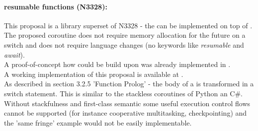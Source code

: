 \paragraph*{resumable functions (N3328\cite{n3328}):}
This proposal is a library superset of N3328 - the \resumfn can be implemented
on top of \coro. The proposed coroutine does not require memory allocation for
the future on a switch and does not require language changes (no keywords like
\textit{resumable} and \textit{await}).\\
A proof-of-concept how \await could be build upon \boostroroutine was already
implemented in \awaite.\\
\newline
A working implementation of this proposal is available at \boostcoroutine.\\
As described in section 3.2.5 'Function Prolog' - the body of a \resumfn is
transformed in a switch statement. This is similar to the stackless coroutines
of Python an C\#.\\
\newline
Without stackfulness and first-class semantic some useful execution control
flows cannot be supported (for instance cooperative multitasking,
checkpointing) and the 'same fringe' example would not be easily implementable.
